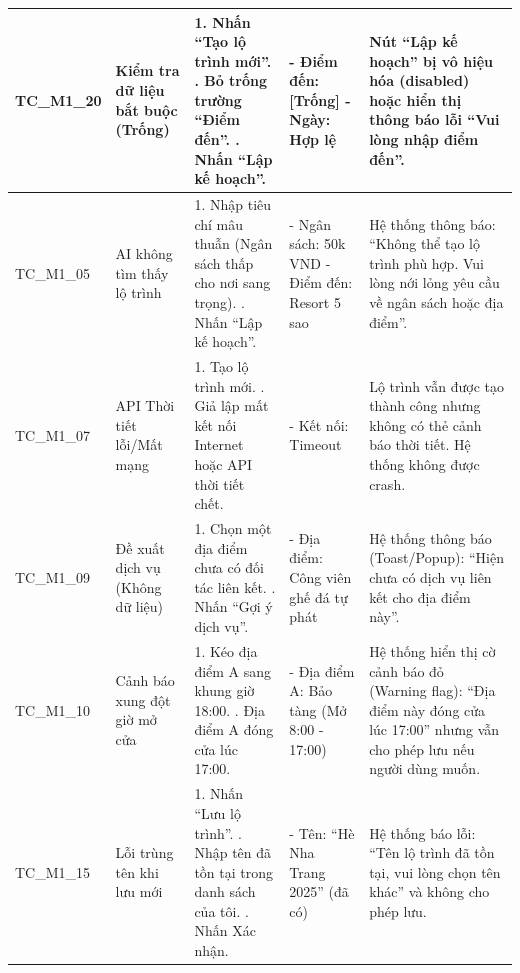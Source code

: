 \begin{landscape}
\begin{longtable}{|p{2.5cm}|p{4.0cm}|p{6.5cm}|p{4.5cm}|p{4.5cm}|}
TC\_M1\_20 & Kiểm tra dữ liệu bắt buộc (Trống) & 
1. Nhấn ``Tạo lộ trình mới''. \newline 
2. Bỏ trống trường ``Điểm đến''. \newline 
3. Nhấn ``Lập kế hoạch''. & 
- Điểm đến: [Trống] \newline
- Ngày: Hợp lệ & 
Nút ``Lập kế hoạch'' bị vô hiệu hóa (disabled) hoặc hiển thị thông báo lỗi ``Vui lòng nhập điểm đến''. \\
\hline

TC\_M1\_05 & AI không tìm thấy lộ trình & 
1. Nhập tiêu chí mâu thuẫn (Ngân sách thấp cho nơi sang trọng). \newline 
2. Nhấn ``Lập kế hoạch''. & 
- Ngân sách: 50k VND \newline 
- Điểm đến: Resort 5 sao & 
Hệ thống thông báo: ``Không thể tạo lộ trình phù hợp. Vui lòng nới lỏng yêu cầu về ngân sách hoặc địa điểm''. \\
\hline

TC\_M1\_07 & API Thời tiết lỗi/Mất mạng & 
1. Tạo lộ trình mới. \newline 
2. Giả lập mất kết nối Internet hoặc API thời tiết chết. & 
- Kết nối: Timeout & 
Lộ trình vẫn được tạo thành công nhưng không có thẻ cảnh báo thời tiết. Hệ thống không được crash. \\
\hline

TC\_M1\_09 & Đề xuất dịch vụ (Không dữ liệu) & 
1. Chọn một địa điểm chưa có đối tác liên kết. \newline 
2. Nhấn ``Gợi ý dịch vụ''. & 
- Địa điểm: Công viên ghế đá tự phát & 
Hệ thống thông báo (Toast/Popup): ``Hiện chưa có dịch vụ liên kết cho địa điểm này''. \\
\hline

TC\_M1\_10 & Cảnh báo xung đột giờ mở cửa & 
1. Kéo địa điểm A sang khung giờ 18:00. \newline 
2. Địa điểm A đóng cửa lúc 17:00. & 
- Địa điểm A: Bảo tàng (Mở 8:00 - 17:00) & 
Hệ thống hiển thị cờ cảnh báo đỏ (Warning flag): ``Địa điểm này đóng cửa lúc 17:00'' nhưng vẫn cho phép lưu nếu người dùng muốn. \\
\hline

TC\_M1\_15 & Lỗi trùng tên khi lưu mới & 
1. Nhấn ``Lưu lộ trình''. \newline 
2. Nhập tên đã tồn tại trong danh sách của tôi. \newline 
3. Nhấn Xác nhận. & 
- Tên: ``Hè Nha Trang 2025'' (đã có) & 
Hệ thống báo lỗi: ``Tên lộ trình đã tồn tại, vui lòng chọn tên khác'' và không cho phép lưu. \\
\hline


\end{longtable}
\end{landscape}
